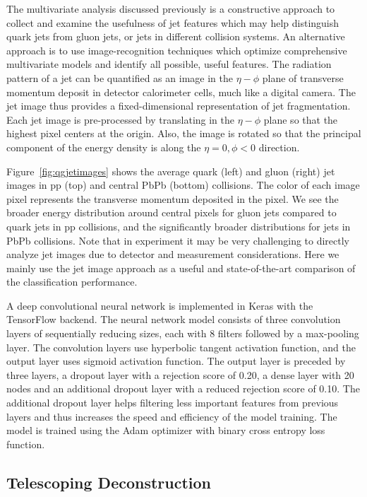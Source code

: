 \documentclass[notoc]{JHEP3}
\begin{document}
The multivariate analysis discussed previously is a constructive approach to collect and examine the usefulness of jet features which may help distinguish quark jets from gluon jets, or jets in different collision systems. An alternative approach is to use image-recognition techniques which optimize comprehensive multivariate models and identify all possible, useful features. The radiation pattern of a jet can be quantified as an image in the $\eta-\phi$ plane of transverse momentum deposit in detector calorimeter cells, much like a digital camera. The jet image thus provides a fixed-dimensional representation of jet fragmentation. Each jet image is pre-processed \cite{deOliveira:2015xxd} by translating in the $\eta-\phi$ plane so that the highest pixel centers at the origin. Also, the image is rotated so that the principal component of the energy density is along the $\eta=0, \phi<0$ direction.

Figure~\ref{fig:qgjetimages} shows the average quark (left) and gluon (right) jet images in pp (top) and central PbPb (bottom) collisions. The color of each image pixel represents the transverse momentum deposited in the pixel. We see the broader energy distribution around central pixels for gluon jets compared to quark jets in pp collisions, and the significantly broader distributions for jets in PbPb collisions. Note that in experiment it may be very challenging to directly analyze jet images due to detector and measurement considerations. Here we mainly use the jet image approach as a useful and state-of-the-art comparison of the classification performance.
	
A deep convolutional neural network is implemented in Keras with the TensorFlow \cite{DBLP:journals/corr/AbadiBCCDDDGIIK16} backend. The neural network model consists of three convolution layers of sequentially reducing sizes, each with 8 filters followed by a max-pooling layer. The convolution layers use hyperbolic tangent activation function, and the output layer uses sigmoid activation function. The output layer is preceded by three layers, a dropout layer with a rejection score of 0.20, a dense layer with 20 nodes and an additional dropout layer with a reduced rejection score of 0.10. The additional dropout layer helps filtering less important features from previous layers and thus increases the speed and efficiency of the model training. The model is trained using the Adam optimizer with binary cross entropy loss function.
	
\subsection{Telescoping Deconstruction}
\label{sec:tjet}
\end{document}
